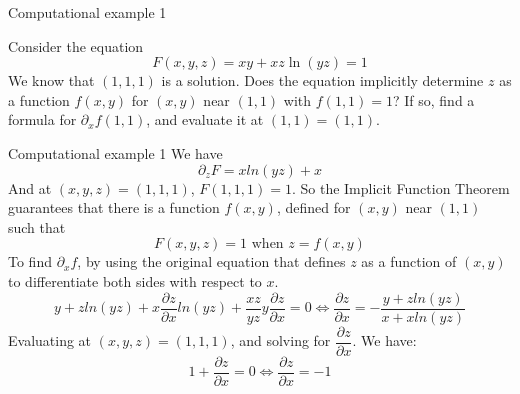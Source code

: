 \begin{frame}{Computational example 1}
    \begin{parchment}[Problem 01]
        Consider the equation
        \begin{equation}
            F(x,y,z) = xy+ xz \ln(yz)  =1
        \end{equation}
        We know that $(1, 1, 1)$ is a solution. Does the equation implicitly determine $z$ as a function $f(x, y)$ for $(x,y)$ near $(1, 1)$ with $f(1, 1) = 1$? If so, find a formula for $\partial_x f(1, 1)$, and evaluate it at $(1, 1) = (1, 1)$.
    \end{parchment}
\end{frame}

\begin{frame}{Computational example 1}
    We have
    \begin{equation}
        \partial_zF = xln(yz) + x
    \end{equation}
    And at $(x, y, z) = (1, 1, 1)$, $F(1, 1, 1) = 1$. So the Implicit Function Theorem guarantees that there is a function $f(x, y)$, defined for $(x, y)$ near $(1, 1)$ such that
    \begin{equation}
        F(x, y,z) = 1 \text{ when } z = f(x, y)
    \end{equation}
    To find $\partial_xf$, by using the original equation that defines $z$ as a function of $(x, y)$ to differentiate both sides with respect to $x$.
    \begin{equation}
        y + zln(yz) + x\dfrac{\partial z}{\partial x}ln(yz) + \dfrac{xz}{yz}y\dfrac{\partial z}{\partial x} = 0 \Leftrightarrow \dfrac{\partial z}{\partial x} = - \dfrac{y + zln(yz)}{x + xln(yz)}
    \end{equation}
    Evaluating at $(x, y, z) = (1, 1, 1)$, and solving for $\dfrac{\partial z}{\partial x}$. We have:
    \begin{equation}
        1 + \dfrac{\partial z}{\partial x} = 0 \Leftrightarrow \dfrac{\partial z}{\partial x} = -1
    \end{equation}
\end{frame}

